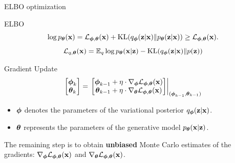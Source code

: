 \documentclass{beamer}
\renewcommand{\eqpause}{}
\begin{document}
\begin{frame}{ELBO optimization}
	\begin{block}{ELBO}
		\vspace{-0.3cm}
		\[
			\log \pt(\bx) = \cL_{\bphi, \btheta}(\bx) + \KL(q_{\bphi}(\bz| \bx) \| \pt(\bz|\bx)) \geq \cL_{\bphi, \btheta}(\bx).
		\]
		\[
		 	\cL_{q, \btheta}(\bx) = \bbE_{q} \log \pt(\bx | \bz) - \KL(q_{\bphi}(\bz| \bx) \| p(\bz))
		\]
		\vspace{-0.5cm}
	\end{block}
	\eqpause
	\begin{block}{Gradient Update}
		\[
			\begin{bmatrix}
				\bphi_k \\
				\btheta_k
			\end{bmatrix}
			= \left.
			\begin{bmatrix}
				\bphi_{k-1} + \eta \cdot \nabla_{\bphi} \cL_{\bphi, \btheta}(\bx) \\
				\btheta_{k-1} + \eta \cdot \nabla_{\btheta} \cL_{\bphi, \btheta}(\bx)
			\end{bmatrix}
			\right|_{(\bphi_{k-1}, \btheta_{k-1})}
		\]
		\begin{itemize}
			\item $\bphi$ denotes the parameters of the variational posterior $q_{\bphi}(\bz| \bx)$.
			\item $\btheta$ represents the parameters of the generative model $\pt(\bx | \bz)$.
		\end{itemize}
	\end{block}
	\eqpause
	The remaining step is to obtain \textbf{unbiased} Monte Carlo estimates of the gradients: $\nabla_{\bphi} \cL_{\bphi, \btheta}(\bx)$ and $\nabla_{\btheta} \cL_{\bphi, \btheta}(\bx)$. 
\end{frame}
\end{document}
